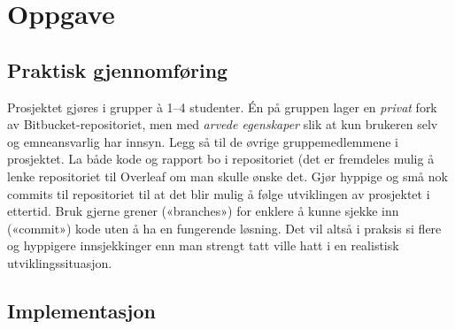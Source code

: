\documentclass[11pt,a4paper]{article}
\begin{document}
\section{Oppgave}

\subsection{Praktisk gjennomføring}

Prosjektet gjøres i grupper à 1–4 studenter. Én på gruppen lager en \emph{privat} fork av Bitbucket-repositoriet, men med \emph{arvede egenskaper} slik at kun brukeren selv og emneansvarlig har innsyn. Legg så til de øvrige gruppemedlemmene i prosjektet. La både kode og rapport bo i repositoriet (det er fremdeles mulig å lenke repositoriet til Overleaf om man skulle ønske det. Gjør hyppige og små nok commits til repositoriet til at det blir mulig å følge utviklingen av prosjektet i ettertid. Bruk gjerne grener («branches») for enklere å kunne sjekke inn («commit») kode uten å ha en fungerende løsning. Det vil altså i praksis si flere og hyppigere innsjekkinger enn man strengt tatt ville hatt i en realistisk utviklingssituasjon.

\subsection{Implementasjon}
\end{document}
